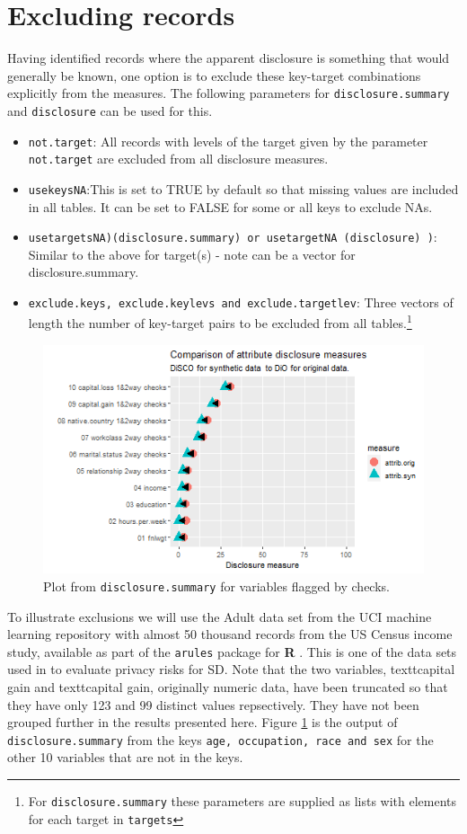 \documentclass[12pt]{article}
\begin{document}
\section{Excluding records}\label{sec:exclusions}
Having identified records where the apparent disclosure is something that would generally be known, one option is to exclude these key-target combinations explicitly from the measures. The following parameters 
for \texttt{disclosure.summary} and \texttt{disclosure} can be used for this.
\begin{itemize}
\item{\texttt{not.target}: All records with levels of the target given by the parameter \texttt{not.target} are excluded from all disclosure measures.}
\item{\texttt{usekeysNA}:This is set to TRUE by default so that missing values are included in all tables. It can be set to FALSE for some or all keys to exclude NAs.}
\item{\texttt{usetargetsNA)(disclosure.summary) or usetargetNA (disclosure) )}: Similar to the above for target(s) - note can be a vector for disclosure.summary.}
\item{\texttt{exclude.keys, exclude.keylevs and exclude.targetlev}: Three vectors of length the number of key-target pairs to be excluded from all tables.\footnote{For \texttt{disclosure.summary} these parameters are supplied as lists with elements for each target in \texttt{targets}}}
\end{itemize}
\begin{figure}[ht]
\centering
\includegraphics[width=1\linewidth]{fig2dis.png}
\caption{Plot from \texttt{disclosure.summary} for variables flagged by checks.}
\label{fig:f2}
\end{figure}
To illustrate exclusions we will use the Adult data set from the UCI machine learning repository \cite{UCI} with almost 50 thousand records from the US Census income study, available as part of the \texttt{arules} package for \textbf{R} \cite{arules}. This is one of the data sets used in \cite{giomi2022anon} to evaluate privacy risks for SD. Note that the two variables, textt{capital gain} and textt{capital gain}, originally numeric data, have been truncated so that they have only 123 and 99 distinct values repsectively. They have not been grouped further in the results presented here.  Figure \ref{fig:f2} is the output of \texttt{disclosure.summary} from the keys \texttt{age, occupation, race and sex} for the other 10 variables that are not in the keys.
\end{document}
